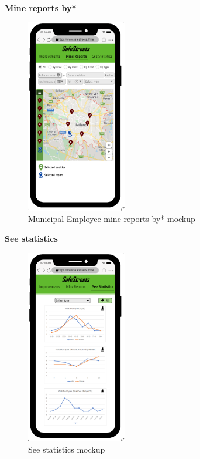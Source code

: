 					\begin{center}
						{\small \textbf{Mine reports by*}}
					\end{center}
					\vspace{-5mm}
					\begin{figure}[!h]
						\centering
						\includegraphics[height=8.5cm]{images/MockUp/Authority/MunicipalEmployee/MineReports.png}
						\caption{Municipal Employee mine reports by* mockup}
					\end{figure}
					\vspace{-1mm}
					\begin{center}
						{\small \textbf{See statistics}}
					\end{center}
					\vspace{-5mm}
					\begin{figure}[!h]
						\centering
						\includegraphics[height=8.5cm]{images/MockUp/Authority/MunicipalEmployee/SeeStatistics.png}
						\caption{See statistics mockup}
					\end{figure}
				\clearpage
